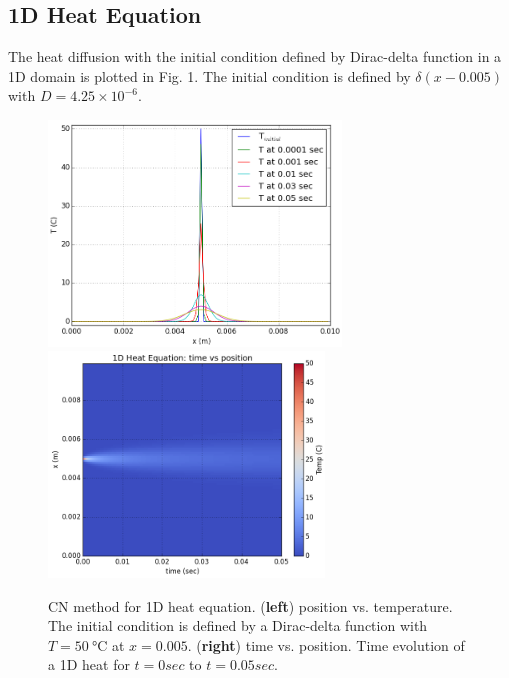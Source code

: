 \documentclass[12pt]{article}		%
\begin{document}
\subsection*{1D Heat Equation}
The heat diffusion with the initial condition defined by Dirac-delta function in a 1D domain is plotted in Fig. 1. The initial condition is defined by $\delta (x-0.005)$ with $D = 4.25 \times 10^{-6}$.

\begin{figure}[h]
\centering
\includegraphics[height=6cm]{figure-1-1d_heat.png}\quad
\includegraphics[height=6cm]{figure-2-1d_heat.png}\par\medskip
\caption{CN method for 1D heat equation. (\textbf{left}) position vs. temperature. The initial condition is defined by a Dirac-delta function with $T = \SI{50}{\degreeCelsius}$ at $x = 0.005$. (\textbf{right}) time vs. position. Time evolution of a 1D heat for $t = 0 sec$ to $t = 0.05 sec$.}


\end{figure}
\end{document}
